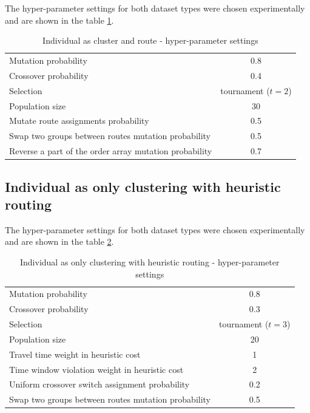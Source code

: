 The hyper-parameter settings for both dataset types were chosen experimentally and are shown in the table \ref{tab:evo_cr_hyperparams}.

\begin{table}[ht]
    \centering
    \begin{tabular}{lc}
        Mutation probability & 0.8 \\
        Crossover probability & 0.4 \\
        Selection & tournament ($t=2$) \\
        Population size & 30 \\
        Mutate route assignments probability & 0.5 \\
        Swap two groups between routes mutation probability & 0.5 \\
        Reverse a part of the order array mutation probability & 0.7 \\ 
    \end{tabular}
    \caption{Individual as cluster and route - hyper-parameter settings}
    \label{tab:evo_cr_hyperparams}
\end{table}

\subsection{Individual as only clustering with heuristic routing}

The hyper-parameter settings for both dataset types were chosen experimentally and are shown in the table \ref{tab:evo_ch_hyperparams}.

\begin{table}[ht]
    \centering
    \begin{tabular}{lc}
        Mutation probability & 0.8 \\
        Crossover probability & 0.3 \\
        Selection & tournament ($t=3$) \\
        Population size & 20 \\
        Travel time weight in heuristic cost & 1 \\
        Time window violation weight in heuristic cost & 2 \\
        Uniform crossover switch assignment probability & 0.2 \\
        Swap two groups between routes mutation probability & 0.5 \\
    \end{tabular}
    \caption{Individual as only clustering with heuristic routing - hyper-parameter settings}
    \label{tab:evo_ch_hyperparams}
\end{table}